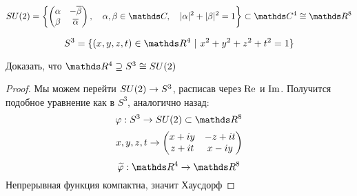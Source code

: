 \documentclass[main]{subfiles}
\begin{document}
    \begin{Definition}
      \[SU(2) = \left\{ \begin{pmatrix}
        \alpha & - \ol{\beta}\\
        \beta & \ol{\alpha}
      \end{pmatrix},\q \alpha,\beta \in \CC,\q |\alpha|^2 + |\beta|^2 = 1 \right\} \subset \CC^4 \cong \R^8\]
    \end{Definition}

    \begin{Definition}
      \[S^3 = \{(x,y,z,t) \in \R^4\ |\ x^2+y^2+z^2+t^2 =1 \}\]
    \end{Definition}

    \begin{example}
      Доказать, что $\R^4 \supseteq S^3 \cong SU(2)$
    \end{example}

    \begin{proof}
      Мы можем перейти $SU(2) \rightarrow S^3$, расписав через $\mathop{\rm Re}\nolimits$ и $\mathop{\rm Im}\nolimits$. Получится подобное уравнение как в $S^3$, аналогично назад:
      \[\varphi: S^3 \ra SU(2) \subset \R^8\]
      \[x,y,z,t  \rightarrow \begin{pmatrix}
        x + iy & -z + it\\
        z + it & x - iy
      \end{pmatrix}\]
      \[\w{\varphi}: \R^4 \ra \R^8\]
      Непрерывная функция компактна, значит Хаусдорф
    \end{proof}
\end{document}
